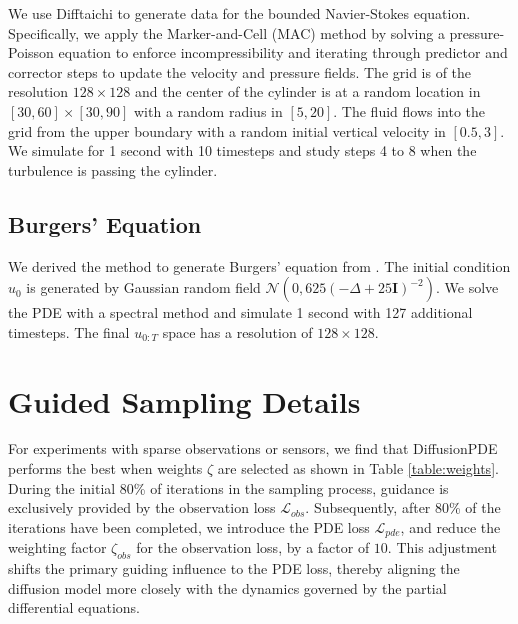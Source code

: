 We use Difftaichi \cite{hu2019difftaichi} to generate data for the bounded Navier-Stokes equation. Specifically, we apply the Marker-and-Cell (MAC) method by solving a pressure-Poisson equation to enforce incompressibility and iterating through predictor and corrector steps to update the velocity and pressure fields. The grid is of the resolution $128\times 128$ and the center of the cylinder is at a random location in $[30,60]\times[30,90]$ with a random radius in $[5, 20]$. The fluid flows into the grid from the upper boundary with a random initial vertical velocity in $[0.5, 3]$. We simulate for 1 second with 10 timesteps and study steps 4 to 8 when the turbulence is passing the cylinder.

\vspace{-0.2em}
\subsection{Burgers' Equation}

We derived the method to generate Burgers' equation from \cite{li2020fourier}. The initial condition $u_0$ is generated by Gaussian random field $\mathcal{N}(0,625(-\Delta+25\mathbf{I})^{-2})$. We solve the PDE with a spectral method and simulate 1 second with 127 additional timesteps. The final $u_{0:T}$ space has a resolution of $128\times 128$.

\section{Guided Sampling Details}\label{sec:weights}
\vspace{-0.3em}

For experiments with sparse observations or sensors, we find that DiffusionPDE performs the best when weights $\zeta$ are selected as shown in Table \ref{table:weights}. During the initial 80\% of iterations in the sampling process, guidance is exclusively provided by the observation loss $\mathcal{L}_{obs}$. Subsequently, after 80\% of the iterations have been completed, we introduce the PDE loss $\mathcal{L}_{pde}$, and reduce the weighting factor $\zeta_{obs}$ for the observation loss, by a factor of $10$. This adjustment shifts the primary guiding influence to the PDE loss, thereby aligning the diffusion model more closely with the dynamics governed by the partial differential equations.

